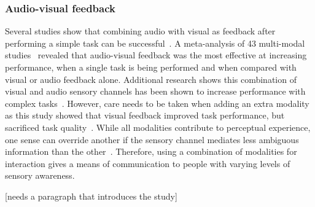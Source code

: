 \documentclass{scaffold/sigchi}
\begin{document}
\subsubsection{Audio-visual feedback}
Several studies show that combining audio with visual as feedback after performing a simple task can be successful~\cite{benefits_of_audio_visual_1, benefits_of_audio_visual_2}. A meta-analysis of 43 multi-modal studies~\cite{comparing_modalities_effects_of_visual_audio} revealed that audio-visual feedback was the most effective at increasing performance, when a single task is being performed and when compared with visual or audio feedback alone. Additional research shows this combination of visual and audio sensory channels has been shown to increase performance with complex tasks~\cite{chi_oussama_tap_the_shapetones}. However, care needs to be taken when adding an extra modality as this study showed that visual feedback improved task performance, but sacrificed task quality~\cite{comparing_modalities_effects_of_visual_audio}. While all modalities contribute to perceptual experience, one sense can override another if the sensory channel mediates less ambiguous information than the other~\cite{one_mode_override_another}. Therefore, using a combination of modalities for interaction gives a means of communication to people with varying levels of sensory awareness.

[needs a paragraph that introduces the study]
\end{document}
